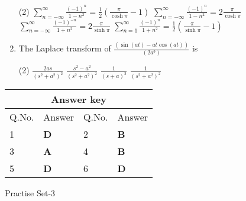 \begin{enumerate}[label=\color{ocre}\textbf{\arabic*.}]
{}
 \begin{tasks}(2)
	\task[\textbf{A.}] $\sum_{n=-\infty}^{\infty} \frac{(-1)^{n}}{1-n^{2}}=\frac{1}{2}\left(\frac{\pi}{\cosh \pi}-1\right)$
	\task[\textbf{B.}]$\sum_{n=-\infty}^{\infty} \frac{(-1)^{n}}{1-n^{2}}=2 \frac{\pi}{\cosh \pi}$
	\task[\textbf{C.}]$\sum_{n=-\infty}^{\infty} \frac{(-1)^{-n}}{1+n^{2}}=2 \frac{\pi}{\sinh \pi}$
	\task[\textbf{D.}] $\sum_{n=1}^{\infty} \frac{(-1)^{n}}{1+n^{2}}=\frac{1}{2}\left(\frac{\pi}{\sinh \pi}-1\right)$
\end{tasks}
\item The Laplace transform of $\frac{(\sin (a t)-a t \cos (a t))}{\left(2 a^{3}\right)}$ is
{}
 \begin{tasks}(2)
	\task[\textbf{A.}]$\frac{2 a s}{\left(s^{2}+a^{2}\right)^{2}}$
	\task[\textbf{B.}]$\frac{s^{2}-a^{2}}{\left(s^{2}+a^{2}\right)^{2}}$
	\task[\textbf{C.}]$\frac{1}{(s+a)^{2}}$
	\task[\textbf{D.}] $\frac{1}{\left(s^{2}+a^{2}\right)^{2}}$
\end{tasks}
\end{enumerate}
\setlength\arrayrulewidth{1pt}
\begin{table}[H]
	\centering
	\begin{tabular}{|p{1.5cm}|p{1.5cm}||p{1.5cm}|p{1.5cm}|}
		\hline
		\multicolumn{4}{|c|}{\textbf{Answer key}}\\\hline\hline
		\rowcolor{ocrel}Q.No.&Answer&Q.No.&Answer\\\hline
		1&\textbf{D} &2&\textbf{B}\\\hline 
		3&\textbf{A} &4&\textbf{B} \\\hline
		5&\textbf{D} &6&\textbf{D} \\\hline
		
	\end{tabular}
\end{table}
\newpage
\begin{abox}
	Practise Set-3
\end{abox}
